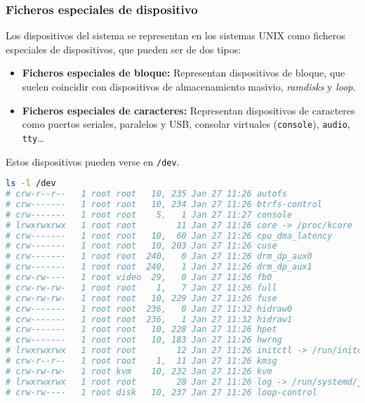 \subsubsection{Ficheros especiales de dispositivo}

Los dispositivos del sistema se representan en los sistemas UNIX como ficheros especiales de dispositivos, que pueden ser de dos tipos:

\begin{itemize}
	\item\textbf{Ficheros especiales de bloque:} Representan dispositivos de bloque, que suelen coincidir con dispositivos de almacenamiento masivio, \emph{ramdisks} y \emph{loop}.
	\item\textbf{Ficheros especiales de caracteres:} Representan dispositivos de caracteres como puertos seriales, paralelos y USB, consolar virtuales (\texttt{console}), \texttt{audio}, \texttt{tty}\ldots
\end{itemize}

Estos dispositivos pueden verse en \texttt{/dev}.

\begin{lstlisting}[language=Bash]
ls -l /dev
# crw-r--r--   1 root root   10, 235 Jan 27 11:26 autofs
# crw-------   1 root root   10, 234 Jan 27 11:26 btrfs-control
# crw-------   1 root root    5,   1 Jan 27 11:27 console
# lrwxrwxrwx   1 root root        11 Jan 27 11:26 core -> /proc/kcore
# crw-------   1 root root   10,  60 Jan 27 11:26 cpu_dma_latency
# crw-------   1 root root   10, 203 Jan 27 11:26 cuse
# crw-------   1 root root  240,   0 Jan 27 11:26 drm_dp_aux0
# crw-------   1 root root  240,   1 Jan 27 11:26 drm_dp_aux1
# crw-rw----   1 root video  29,   0 Jan 27 11:26 fb0
# crw-rw-rw-   1 root root    1,   7 Jan 27 11:26 full
# crw-rw-rw-   1 root root   10, 229 Jan 27 11:26 fuse
# crw-------   1 root root  236,   0 Jan 27 11:32 hidraw0
# crw-------   1 root root  236,   1 Jan 27 11:32 hidraw1
# crw-------   1 root root   10, 228 Jan 27 11:26 hpet
# crw-------   1 root root   10, 183 Jan 27 11:26 hwrng
# lrwxrwxrwx   1 root root        12 Jan 27 11:26 initctl -> /run/initctl
# crw-r--r--   1 root root    1,  11 Jan 27 11:26 kmsg
# crw-rw-rw-   1 root kvm    10, 232 Jan 27 11:26 kvm
# lrwxrwxrwx   1 root root        28 Jan 27 11:26 log -> /run/systemd/journal/dev-log
# crw-rw----   1 root disk   10, 237 Jan 27 11:26 loop-control
\end{lstlisting}

